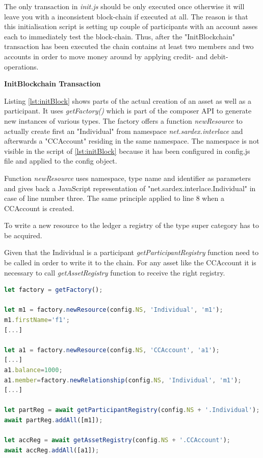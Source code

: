 The only transaction in \textit{init.js} should be only executed once otherwise it will leave you with a inconsistent block-chain if executed at all. The reason is that this initialisation script is setting up couple of participants with an account asses each to immediately test the block-chain. Thus, after the "InitBlockchain" transaction has been executed the chain contains at least two members and two accounts in order to move money around by applying credit- and debit-operations.

\textbf{InitBlockchain Transaction}

Listing \ref{lst:initBlock} shows parts of the actual creation of an asset as well as a participant. It uses \textit{getFactory()} which is part of the composer API to generate new instances of various types. The factory offers a function \textit{newResource} to actually create first an "Individual" from namespace \textit{net.sardex.interlace} and afterwards a "CCAccount" residing in the same namespace. The namespace is not visible in the script of \ref{lst:initBlock} because it has been configured in config.js file and applied to the config object.

Function \textit{newResource} uses namespace, type name and identifier as parameters and gives back a JavaScript representation of "net.sardex.interlace.Individual" in case of line number three. The same principle applied to line 8 when a CCAccount is created.

To write a new resource to the ledger a registry of the type super category has to be acquired.

Given that the Individual is a participant \textit{getParticipantRegistry} function need to be called in order to write it to the chain. For any asset like the CCAccount it is necessary to call \textit{getAssetRegistry} function to receive the right registry.

\begin{center}
\begin{minipage}{0.8\textwidth}
\small
\begin{lstlisting}[language=javascript,firstnumber=1,caption={\bf\small chain-code adding a new resource in \textit{initBlockchain} function}, captionpos=b,label=lst:initBlock]
let factory = getFactory();

let m1 = factory.newResource(config.NS, 'Individual', 'm1');
m1.firstName='f1';
[...]

let a1 = factory.newResource(config.NS, 'CCAccount', 'a1');
[...]
a1.balance=1000;
a1.member=factory.newRelationship(config.NS, 'Individual', 'm1');
[...]

let partReg = await getParticipantRegistry(config.NS + '.Individual');
await partReg.addAll([m1]);

let accReg = await getAssetRegistry(config.NS + '.CCAccount');
await accReg.addAll([a1]);
\end{lstlisting}
\end{minipage}
\end{center}

